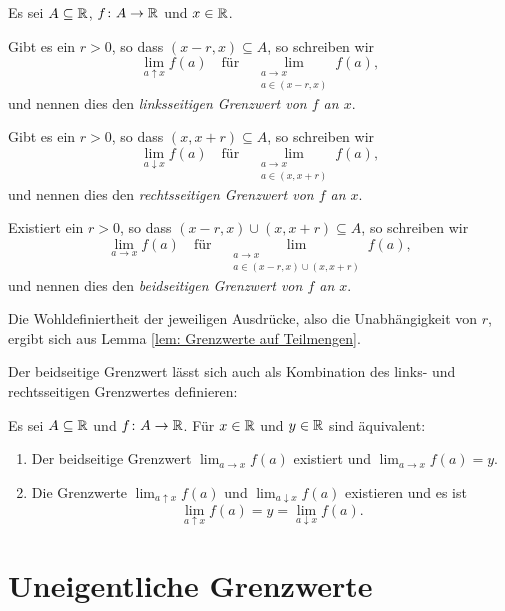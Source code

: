 \documentclass[a4paper,10pt]{article}
\begin{document}
\begin{defi}
 Es sei $A \subseteq \mathbb{R}$, $f \colon A \to \mathbb{R}$ und $x \in \mathbb{R}$.
 
 Gibt es ein $r > 0$, so dass $(x-r, x) \subseteq A$, so schreiben wir
 \[
  \lim_{a \uparrow x} f(a)
  \quad
  \text{für}
  \quad
  \lim_{\substack{a \to x \\ a \in (x-r,x)}} f(a),
 \]
 und nennen dies den \emph{linksseitigen Grenzwert von $f$ an $x$}.
 
 Gibt es ein $r > 0$, so dass $(x,x+r) \subseteq A$, so schreiben wir
 \[
  \lim_{a \downarrow x} f(a)
  \quad
  \text{für}
  \quad
  \lim_{\substack{a \to x \\ a \in (x,x+r)}} f(a),
 \]
 und nennen dies den \emph{rechtsseitigen Grenzwert von $f$ an $x$}.
 
 Existiert ein $r > 0$, so dass $(x-r,x) \cup (x,x+r) \subseteq A$, so schreiben wir
 \[
  \lim_{a \to x} f(a)
  \quad
  \text{für}
  \quad
  \lim_{\substack{a \to x \\ a \in (x-r,x) \cup (x,x+r)}} f(a),
 \]
 und nennen dies den \emph{beidseitigen Grenzwert von $f$ an $x$}.
\end{defi}


Die Wohldefiniertheit der jeweiligen Ausdrücke, also die Unabhängigkeit von $r$, ergibt sich aus Lemma \ref{lem: Grenzwerte auf Teilmengen}.


Der beidseitige Grenzwert lässt sich auch als Kombination des links- und rechtsseitigen Grenzwertes definieren:


\begin{lem}
 Es sei $A \subseteq \mathbb{R}$ und $f \colon A \to \mathbb{R}$. Für $x \in \mathbb{R}$ und $y \in \mathbb{R}$ sind äquivalent:
 \begin{enumerate}
  \item
   Der beidseitige Grenzwert $\lim_{a \to x} f(a)$ existiert und $\lim_{a \to x} f(a) = y$.
  \item
   Die Grenzwerte $\lim_{a \uparrow x} f(a)$ und $\lim_{a \downarrow x} f(a)$ existieren und es ist
   \[
    \lim_{a \uparrow x} f(a) = y = \lim_{a \downarrow x} f(a).
   \]
 \end{enumerate}
\end{lem}





\section{Uneigentliche Grenzwerte}
\end{document}
